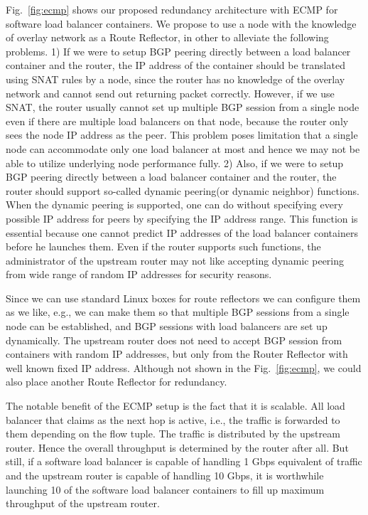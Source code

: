Fig.~\ref{fig:ecmp} shows our proposed redundancy architecture with ECMP for software load balancer containers.
%
We propose to use a node with the knowledge of overlay network as a Route Reflector, in other to alleviate the following problems.
%
1) If we were to setup BGP peering directly between a load balancer container and the router, the IP address of the container should be translated using SNAT rules by a node, since the router has no knowledge of the overlay network and cannot send out returning packet correctly.
However, if we use SNAT, the router usually cannot set up multiple BGP session from a single node even if there are multiple load balancers on that node, because the router only sees the node IP address as the peer.
This problem poses limitation that a single node can accommodate only one load balancer at most and hence we may not be able to utilize underlying node performance fully.
%
2) Also, if we were to setup BGP peering directly between a load balancer container and the router, the router should support so-called dynamic peering(or dynamic neighbor) functions.
When the dynamic peering is supported, one can do without specifying every possible IP address for peers by specifying the IP address range.
This function is essential because one cannot predict IP addresses of the load balancer containers before he launches them.
Even if the router supports such functions, the administrator of the upstream router may not like accepting dynamic peering from wide range of random IP addresses for security reasons.

Since we can use standard Linux boxes for route reflectors we can configure them as we like, e.g., we can make them so that multiple BGP sessions from a single node can be established, and BGP sessions with load balancers are set up dynamically.
The upstream router does not need to accept BGP session from containers with random IP addresses, but only from the Router Reflector with well known fixed IP address.
Although not shown in the Fig.~\ref{fig:ecmp}, we could also place another Route Reflector for redundancy.

The notable benefit of the ECMP setup is the fact that it is scalable.
All load balancer that claims as the next hop is active, i.e., the traffic is forwarded to them depending on the flow tuple.
The traffic is distributed by the upstream router. Hence the overall throughput is determined by the router after all.
But still, if a software load balancer is capable of handling 1 Gbps equivalent of traffic and the upstream router is capable of handling 10 Gbps, it is worthwhile launching 10 of the software load balancer containers to fill up maximum throughput of the upstream router.

